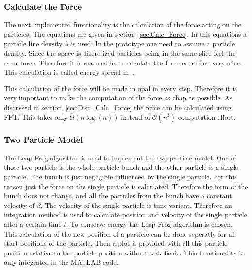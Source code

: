\documentclass[11pt,a4paper]{article}
\begin{document}
\subsubsection{Calculate the Force}
The next implemented functionality is the calculation of the force acting on the particles. The equations are given in section~\ref{sec:Calc_Force}. In this equations a particle line density $\lambda$ is used. In the prototype one need to assume a particle density. Since the space is discretized particles being in the same slice feel the same force. Therefore it is reasonable to calculate the force exert for every slice. This calculation is called energy spread in~\cite{notebook}.

This calculation of the force will be made in opal in every step. Therefore it is very important to make the computation of the force as chap as possible. As discussed in section~\ref{sec:Disc_Calc_Force} the force can be calculated using FFT. This takes only $\mathcal{O}(n \log(n))$ instead of $\mathcal{O}(n^2)$ computation effort.
\subsubsection{Two Particle Model}
\label{sec:Two_Particle_Model}
The Leap Frog algorithm is used to implement the two particle model. One of
those two particle is the whole particle bunch and the other particle is a
single particle. The bunch is just negligible influenced by the single
particle. For this reason just the force on the single particle is
calculated. Therefore the form of the bunch does not change, and all the
particles from the bunch have a constant velocity of $\beta$. The velocity of
the single particle is time variant. Therefore an integration method is used to calculate position and velocity of the single particle after a certain time $t$. To conserve energy the Leap Frog algorithm is chosen. \\
This calculation of the new position of a particle can be done seperatly for all start positions of the particle. Then a plot is provided with all this particle position relative to the particle position without wakefields. This functionality is only integrated in the MATLAB code.
\end{document}
